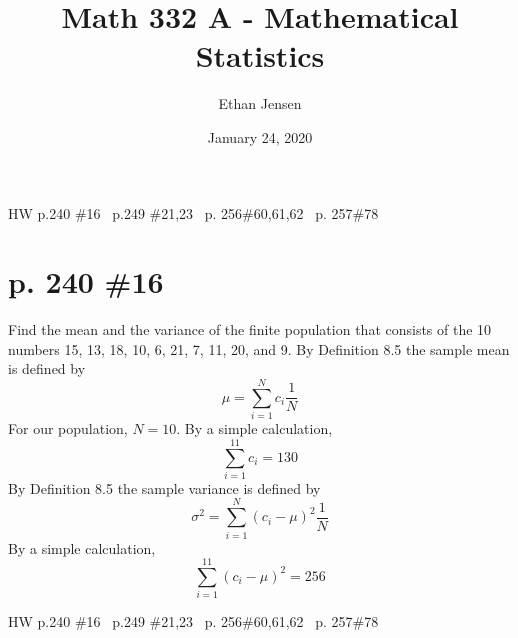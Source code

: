 \documentclass[12pt]{article}
\title{Math 332 A - Mathematical Statistics}
\author{Ethan Jensen}
\date{January 24, 2020}
\begin{document}
	\maketitle HW p.240 \#16 \ p.249 \#21,23 \ p. 256\#60,61,62 \ p. 257\#78
	\section[20pt]{p. 240 \#16}
	Find the mean and the variance of the finite population that consists of the 10 numbers 15, 13, 18, 10, 6, 21, 7, 11, 20, and 9.
	\newline \newline
	By Definition 8.5 the sample mean is defined by
	\[\mu = \sum_{i=1}^Nc_i\frac{1}{N}\]
	For our population, \(N = 10\).
	By a simple calculation,
	\[\sum_{i=1}^{11}c_i = 130\]
	\newline
	\newline
	By Definition 8.5 the sample variance is defined by
	\[\sigma^2 = \sum_{i=1}^N(c_i-\mu)^2\frac{1}{N}\]
	By a simple calculation,
	\[\sum_{i=1}^{11}(c_i-\mu)^2 = 256\]
	\newline
	\newline
	\newpage

	\maketitle HW p.240 \#16 \ p.249 \#21,23 \ p. 256\#60,61,62 \ p. 257\#78
\end{document}
